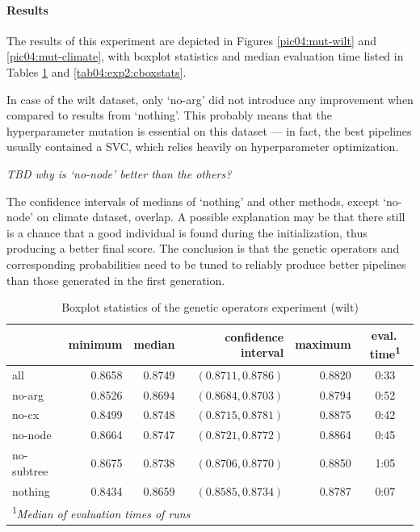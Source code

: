 \paragraph{Results}
The results of this experiment are depicted in Figures \ref{pic04:mut-wilt} and
\ref{pic04:mut-climate}, with boxplot statistics and median evaluation time
listed in Tables \ref{tab04:exp2:wboxstats} and \ref{tab04:exp2:cboxstats}.

In case of the wilt dataset, only `no-arg' did not introduce any improvement
when compared to results from `nothing'. This probably means that the
hyperparameter mutation is essential on this dataset --- in fact, the best
pipelines usually contained a SVC, which relies heavily on hyperparameter
optimization. \citep{Feurer:2015:ERA:2969442.2969547}

\textit{TBD why is `no-node' better than the others?}

The confidence intervals of medians of `nothing' and other methods, except
`no-node' on climate dataset, overlap. A possible explanation may be that
there still is a chance that a good individual is found during the
initialization, thus producing a better final score. The conclusion is that the
genetic operators and corresponding probabilities need to be tuned to reliably
produce better pipelines than those generated in the first generation.

\begin{table}[ht]
\centering
\caption{Boxplot statistics of the genetic operators experiment (wilt)}\label{tab04:exp2:wboxstats}
\begin{tabular}{lrrrr|c}
\toprule
{} &  minimum &  median &  confidence interval &  maximum & eval.\,time\textsuperscript{1} \\
\midrule
all        &   0.8658 &  0.8749 &   $(0.8711,0.8786)$ &   0.8820 & 0:33 \\
no-arg     &   0.8526 &  0.8694 &   $(0.8684,0.8703)$ &   0.8794 & 0:52 \\
no-cx      &   0.8499 &  0.8748 &   $(0.8715,0.8781)$ &   0.8875 & 0:42 \\
no-node    &   0.8664 &  0.8747 &   $(0.8721,0.8772)$ &   0.8864 & 0:45 \\
no-subtree &   0.8675 &  0.8738 &   $(0.8706,0.8770)$ &   0.8850 & 1:05 \\
nothing    &   0.8434 &  0.8659 &   $(0.8585,0.8734)$ &   0.8787 & 0:07 \\
\bottomrule

\multicolumn{6}{l}{\footnotesize\textsuperscript{1}\itshape Median of evaluation times of runs}

\end{tabular}

\end{table}

